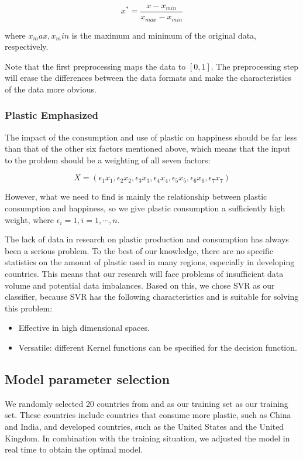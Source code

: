 \documentclass{mcmthesis}
\begin{document}
\begin{equation}
x^* = \frac{x - x_{min}}{x_{max} - x_{min}}
\label{toone}
\end{equation}

where $x_max,x_min$ is the maximum and minimum of the original data, respectively.

Note that the first preprocessing maps the data to $[0,1]$. The preprocessing step will erase the differences between the data formats and make the characteristics of the data more obvious.

\subsubsection{Plastic Emphasized}

The impact of the consumption and use of plastic on happiness should be far less than that of the other six factors mentioned above, which means that the input to the problem should be a weighting of all seven factors:

\begin{equation}
X = (\epsilon_1 x_1, \epsilon_2 x_2, \epsilon_3 x_3, \epsilon_4 x_4, \epsilon_5 x_5, \epsilon_6 x_6, \epsilon_7 x_7)
\end{equation}

However, what we need to find is mainly the relationship between plastic consumption and happiness, so we give plastic consumption a sufficiently high weight, where $\epsilon_i = 1, i = 1, \cdots, n$.

The lack of data\cite{lack} in research on plastic production and consumption has always been a serious problem. To the best of our knowledge, there are no specific statistics on the amount of plastic used in many regions, especially in developing countries. This means that our research will face problems of insufficient data volume and potential data imbalances. Based on this, we chose SVR as our classifier, because SVR has the following characteristics\cite{SVRs} and is suitable for solving this problem:

\begin{itemize}
	\item Effective in high dimensional spaces.
	\item Versatile: different Kernel functions can be specified for the decision function.
\end{itemize}

\subsection{Model parameter selection}
\label{train}
We randomly selected 20 countries from \cite{World} and \cite{Plastic} as our training set as our training set. These countries include countries that consume more plastic, such as China and India, and developed countries, such as the United States and the United Kingdom. In combination with the training situation, we adjusted the model in real time to obtain the optimal model.
\end{document}
